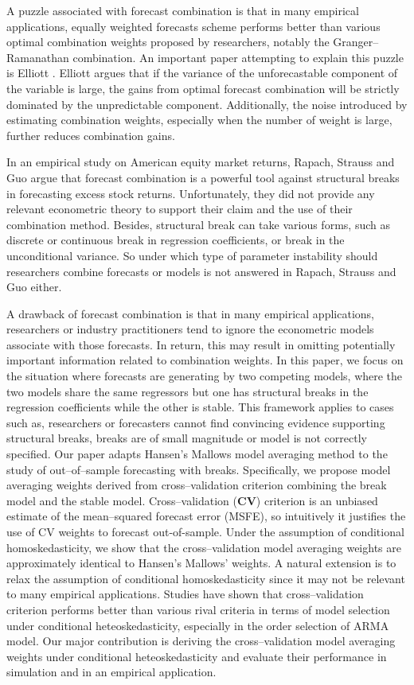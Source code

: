 \documentclass[a4paper,12pt]{article}
\begin{document}
A puzzle associated with forecast combination is that in many empirical applications, equally weighted forecasts scheme performs better than various optimal combination weights proposed by researchers, notably the Granger--Ramanathan combination. An important paper attempting to explain this puzzle is Elliott \cite{elliott11}. Elliott argues that if the variance of the unforecastable component of the variable is large, the gains from optimal forecast combination will be strictly dominated by the unpredictable component. Additionally, the noise introduced by estimating combination weights, especially when the number of weight is large, further reduces combination gains.

In an empirical study on American equity market returns, Rapach, Strauss and Guo \cite{rsz2010} argue that forecast combination is a powerful tool against structural breaks in forecasting excess stock returns. Unfortunately, they did not provide any relevant econometric theory to support their claim and the use of their combination method. Besides, structural break can take various forms, such as discrete or continuous break in regression coefficients, or break in the unconditional variance. So under which type of parameter instability should researchers combine forecasts or models is not answered in Rapach, Strauss and Guo either.

A drawback of forecast combination is that in many empirical applications, researchers or industry practitioners tend to ignore the econometric models associate with those forecasts. In return, this may result in omitting potentially important information related to combination weights. In this paper, we focus on the situation where forecasts are generating by two competing models, where the two models share the same regressors but one has structural breaks in the regression coefficients while the other is stable. This framework applies to cases such as, researchers or forecasters cannot find convincing evidence supporting structural breaks, breaks are of small magnitude or model is not correctly specified. Our paper adapts Hansen's Mallows model averaging method \cite{hansen2009averaging} to the study of out--of--sample forecasting with breaks. Specifically, we propose model averaging weights derived from cross--validation criterion combining the break model and the stable model. Cross--validation (\textbf{CV}) criterion is an unbiased estimate of the mean--squared forecast error (MSFE), so intuitively it justifies the use of CV weights to forecast out-of-sample. Under the assumption of conditional homoskedasticity, we show that the cross--validation model averaging weights are approximately identical to Hansen's Mallows' weights. A natural extension is to relax the assumption of conditional homoskedasticity since it may not be relevant to many empirical applications. Studies have shown that cross--validation criterion performs better than various rival criteria in terms of model selection under conditional heteoskedasticity, especially in the order selection of ARMA model. Our major contribution is deriving the cross--validation model averaging weights under conditional heteoskedasticity and evaluate their performance in simulation and in an empirical application.
\end{document}
